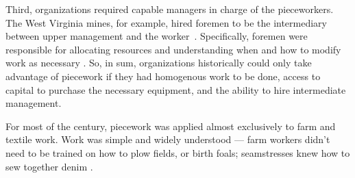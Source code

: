 \documentclass[trackingWork]{subfiles}
\begin{document}
Third, organizations required capable managers in charge of the pieceworkers.
The West Virginia mines, for example, hired foremen 
to be the intermediary between upper management and the worker~\cite{10.2307/2118435}.
Specifically, foremen were responsible for allocating resources and
understanding when and how to modify work as necessary
\cite{wray1949marginal}.
So, in sum, organizations historically could only take advantage of piecework if they had homogenous work to be done, access to capital to purchase the necessary equipment, and the ability to hire intermediate management.


For most of the  century,
piecework was applied almost exclusively to farm and textile work.
Work was simple and widely understood
--- farm workers didn't need to be trained on how to plow fields, or birth foals;
seamstresses knew how to sew together denim
\cite{10.2307/2338394,riisOtherSideLives}.
\end{document}
